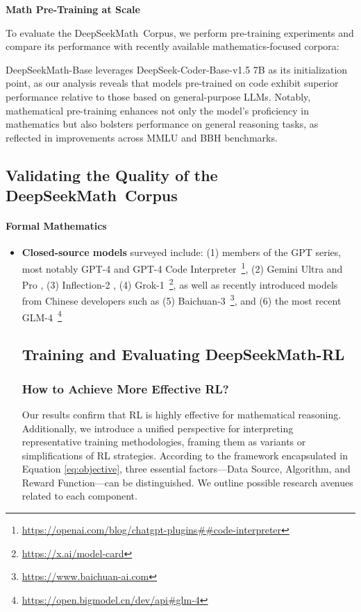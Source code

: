 \begin{itemize}[topsep=0pt]
\textbf{Math Pre-Training at Scale}

To evaluate the DeepSeekMath~Corpus, we perform pre-training experiments and compare its performance with recently available mathematics-focused corpora:

DeepSeekMath-Base leverages DeepSeek-Coder-Base-v1.5 7B \citep{deepseek-coder} as its initialization point, as our analysis reveals that models pre-trained on code exhibit superior performance relative to those based on general-purpose LLMs. Notably, mathematical pre-training enhances not only the model’s proficiency in mathematics but also bolsters performance on general reasoning tasks, as reflected in improvements across MMLU \citep{mmlu} and BBH \citep{bbh} benchmarks.

\subsection{Validating the Quality of the DeepSeekMath~Corpus}

\paragraph{Formal Mathematics}

\begin{itemize}[topsep=0pt]
    \item \textbf{Closed-source models} surveyed include: (1) members of the GPT series, most notably GPT-4 \citep{gpt4} and GPT-4 Code Interpreter~\footnote{\url{https://openai.com/blog/chatgpt-plugins\#\#code-interpreter}}, (2) Gemini Ultra and Pro \citep{gemini}, (3) Inflection-2 \citep{inflection-2}, (4) Grok-1~\footnote{\url{https://x.ai/model-card}},
    as well as recently introduced models from Chinese developers such as (5) Baichuan-3~\footnote{\url{https://www.baichuan-ai.com}},
    and (6) the most recent GLM-4~\footnote{\url{https://open.bigmodel.cn/dev/api\#glm-4}}

\subsection{Training and Evaluating DeepSeekMath-RL}

\subsubsection{How to Achieve More Effective RL?}
\label{sec:effec_rl}
Our results confirm that RL is highly effective for mathematical reasoning. Additionally, we introduce a unified perspective for interpreting representative training methodologies, framing them as variants or simplifications of RL strategies. According to the framework encapsulated in Equation \ref{eq:objective}, three essential factors—Data Source, Algorithm, and Reward Function—can be distinguished. We outline possible research avenues related to each component.


\end{itemize}
\end{itemize}
